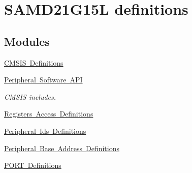 \hypertarget{group___s_a_m_d21_g15_l__definitions}{}\section{S\+A\+M\+D21\+G15L definitions}
\label{group___s_a_m_d21_g15_l__definitions}
\subsection*{Modules}
\begin{DoxyCompactItemize}
\item 
\mbox{\hyperlink{group___s_a_m_d21_g15_l__cmsis}{C\+M\+S\+I\+S Definitions}}
\item 
\mbox{\hyperlink{group___s_a_m_d21_g15_l__api}{Peripheral Software A\+PI}}
\begin{DoxyCompactList}\small\item\em C\+M\+S\+IS includes. \end{DoxyCompactList}\item 
\mbox{\hyperlink{group___s_a_m_d21_g15_l__reg}{Registers Access Definitions}}
\item 
\mbox{\hyperlink{group___s_a_m_d21_g15_l__id}{Peripheral Ids Definitions}}
\item 
\mbox{\hyperlink{group___s_a_m_d21_g15_l__base}{Peripheral Base Address Definitions}}
\item 
\mbox{\hyperlink{group___s_a_m_d21_g15_l__port}{P\+O\+R\+T Definitions}}
\end{DoxyCompactItemize}
